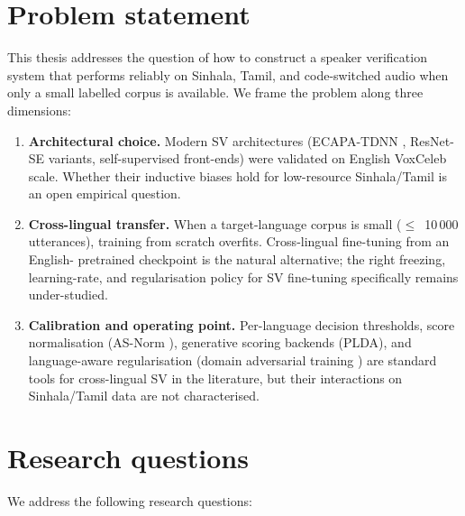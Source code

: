 \section{Problem statement}
\label{sec:problem}

This thesis addresses the question of how to construct a speaker
verification system that performs reliably on Sinhala, Tamil, and
code-switched audio when only a small labelled corpus is available.
We frame the problem along three dimensions:

\begin{enumerate}
    \item \textbf{Architectural choice.} Modern SV architectures
    (ECAPA-TDNN \cite{desplanques2020ecapa}, ResNet-SE variants,
    self-supervised front-ends) were validated on English VoxCeleb
    scale. Whether their inductive biases hold for low-resource
    Sinhala/Tamil is an open empirical question.
    \item \textbf{Cross-lingual transfer.} When a target-language
    corpus is small ($\leq$~10\,000 utterances), training from
    scratch overfits. Cross-lingual fine-tuning from an English-
    pretrained checkpoint is the natural alternative; the right
    freezing, learning-rate, and regularisation policy for SV
    fine-tuning specifically remains under-studied.
    \item \textbf{Calibration and operating point.} Per-language
    decision thresholds, score normalisation (AS-Norm
    \cite{matejka2017analysis}), generative scoring backends (PLDA),
    and language-aware regularisation (domain adversarial training
    \cite{ganin2015dann}) are standard tools for cross-lingual SV in
    the literature, but their interactions on Sinhala/Tamil data
    are not characterised.
\end{enumerate}

\section{Research questions}
\label{sec:rqs}

We address the following research questions:

